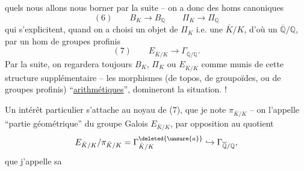 quels nous allons nous borner par la suite -- on a donc des homs canoniques
\[
(6)\qquad B_K\longrightarrow B_{\mathbb Q}\qquad\Pi_K\longrightarrow\Pi_{\mathbb Q}
\]
qui s'explicitent, quand on a choisi un objet de $\Pi_K$ i.e. une $\bar K/K$, d'où un $\overline{\mathbb Q}/\mathbb Q$, par un hom de groupes profinis
\[
(7)\qquad E_{\bar K/K}\longrightarrow\Gamma_{\overline{\mathbb Q}/\mathbb Q}.
\]
Par la suite, on regardera toujours $B_K$, $\Pi_K$ ou $E_{\bar K/K}$ comme munis de cette structure supplémentaire --  les morphismes (de topos, de groupoïdes, ou de groupes profinis) ``\uline{arithmétiques}'', domineront la situation. !

Un intérêt particulier s'attache au noyau de (7), que je note $\pi_{\bar K/K}$ -- on l'appelle ``partie géométrique'' du groupe Galois $E_{\bar K/K}$, par opposition au quotient
\[
E_{\bar K/K}/\pi_{\bar K/K}=\Gamma^{\deleted{\unsure{a}}}_{\bar K/K}\hookrightarrow\Gamma_{\overline{\mathbb Q}/\mathbb Q},
\]
que j'appelle sa
